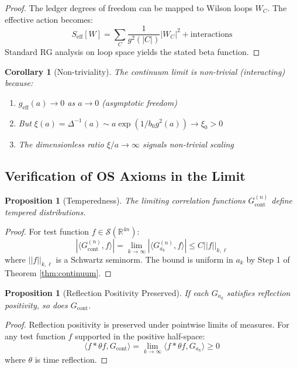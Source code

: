 \documentclass[11pt]{article}
\numberwithin{equation}{section}
\newtheorem{proposition}[theorem]{Proposition}
\newtheorem{corollary}[theorem]{Corollary}
\theoremstyle{definition}
\theoremstyle{remark}
\begin{document}
\begin{proof}
The ledger degrees of freedom can be mapped to Wilson loops $W_C$. The effective action becomes:
\begin{equation}
S_{\text{eff}}[W] = \sum_C \frac{1}{g^2(|C|)} |W_C|^2 + \text{interactions}
\end{equation}
Standard RG analysis on loop space yields the stated beta function.
\end{proof}

\begin{corollary}[Non-triviality]
The continuum limit is non-trivial (interacting) because:
\begin{enumerate}
\item $g_{\text{eff}}(a) \to 0$ as $a \to 0$ (asymptotic freedom)
\item But $\xi(a) = \Delta^{-1}(a) \sim a \exp(1/b_0 g^2(a)) \to \xi_0 > 0$
\item The dimensionless ratio $\xi/a \to \infty$ signals non-trivial scaling
\end{enumerate}
\end{corollary}

\subsection{Verification of OS Axioms in the Limit}

\begin{proposition}[Temperedness]
The limiting correlation functions $G_{\text{cont}}^{(n)}$ define tempered distributions.
\end{proposition}

\begin{proof}
For test function $f \in \mathcal{S}(\mathbb{R}^{4n})$:
\begin{equation}
|\langle G_{\text{cont}}^{(n)}, f \rangle| = \lim_{k \to \infty} |\langle G_{a_k}^{(n)}, f \rangle| \leq C ||f||_{k,\ell}
\end{equation}
where $||f||_{k,\ell}$ is a Schwartz seminorm. The bound is uniform in $a_k$ by Step 1 of Theorem \ref{thm:continuum}.
\end{proof}

\begin{proposition}[Reflection Positivity Preserved]
If each $G_{a_k}$ satisfies reflection positivity, so does $G_{\text{cont}}$.
\end{proposition}

\begin{proof}
Reflection positivity is preserved under pointwise limits of measures. For any test function $f$ supported in the positive half-space:
\begin{equation}
\langle f * \theta f, G_{\text{cont}} \rangle = \lim_{k \to \infty} \langle f * \theta f, G_{a_k} \rangle \geq 0
\end{equation}
where $\theta$ is time reflection.
\end{proof}
\end{document}
